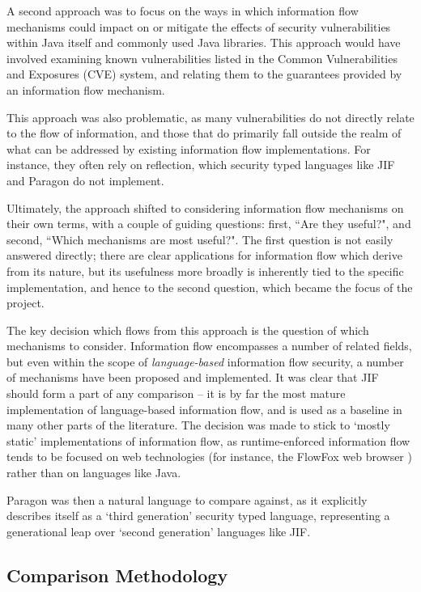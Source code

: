 A second approach was to focus on the ways in which information flow mechanisms could impact on or mitigate the effects of security vulnerabilities within Java itself and commonly used Java libraries. This approach would have involved examining known vulnerabilities listed in the Common Vulnerabilities and Exposures (CVE) system, and relating them to the guarantees provided by an information flow mechanism.

This approach was also problematic, as many vulnerabilities do not directly relate to the flow of information, and those that do primarily fall outside the realm of what can be addressed by existing information flow implementations. For instance, they often rely on reflection, which security typed languages like JIF and Paragon do not implement.

Ultimately, the approach shifted to considering information flow mechanisms on their own terms, with a couple of guiding questions: first, ``Are they useful?", and second, ``Which mechanisms are most useful?". The first question is not easily answered directly; there are clear applications for information flow which derive from its nature, but its usefulness more broadly is inherently tied to the specific implementation, and hence to the second question, which became the focus of the project.

The key decision which flows from this approach is the question of which mechanisms to consider. Information flow encompasses a number of related fields, but even within the scope of \textit{language-based} information flow security, a number of mechanisms have been proposed and implemented. It was clear that JIF should form a part of any comparison -- it is by far the most mature implementation of language-based information flow, and is used as a baseline in many other parts of the literature. The decision was made to stick to `mostly static' implementations of information flow, as runtime-enforced information flow tends to be focused on web technologies (for instance, the FlowFox web browser \cite{degroef2012flowfox}) rather than on languages like Java.

Paragon was then a natural language to compare against, as it explicitly describes itself as a `third generation' security typed language, representing a generational leap over `second generation' languages like JIF.

\subsection{Comparison Methodology}

